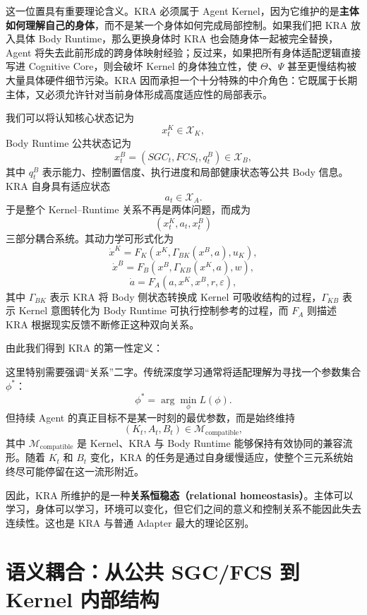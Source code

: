 这一位置具有重要理论含义。KRA 必须属于 Agent Kernel，因为它维护的是\textbf{主体如何理解自己的身体}，而不是某一个身体如何完成局部控制。如果我们把 KRA 放入具体 Body Runtime，那么更换身体时 KRA 也会随身体一起被完全替换，Agent 将失去此前形成的跨身体映射经验；反过来，如果把所有身体适配逻辑直接写进 Cognitive Core，则会破坏 Kernel 的身体独立性，使 $\Theta$、$\Psi$ 甚至更慢结构被大量具体硬件细节污染。KRA 因而承担一个十分特殊的中介角色：它既属于长期主体，又必须允许针对当前身体形成高度适应性的局部表示。

我们可以将认知核心状态记为
\[
x^K_t\in\mathcal X_K,
\]
Body Runtime 公共状态记为
\[
x^B_t
=
\left(
SGC_t,
FCS_t,
q^{B}_t
\right)
\in\mathcal X_B,
\]
其中 $q^B_t$ 表示能力、控制置信度、执行进度和局部健康状态等公共 Body 信息。KRA 自身具有适应状态
\[
a_t\in\mathcal X_A.
\]
于是整个 Kernel--Runtime 关系不再是两体问题，而成为
\[
\boxed{
(x^K_t,a_t,x^B_t)
}
\]
三部分耦合系统。其动力学可形式化为
\[
\dot x^K
=
F_K
\left(
x^K,
\Gamma_{BK}(x^B,a),
u_K
\right),
\]
\[
\dot x^B
=
F_B
\left(
x^B,
\Gamma_{KB}(x^K,a),
w
\right),
\]
\[
\dot a
=
F_A
\left(
a,
x^K,
x^B,
r,
\varepsilon
\right),
\]
其中 $\Gamma_{BK}$ 表示 KRA 将 Body 侧状态转换成 Kernel 可吸收结构的过程，$\Gamma_{KB}$ 表示 Kernel 意图转化为 Body Runtime 可执行控制参考的过程，而 $F_A$ 则描述 KRA 根据现实反馈不断修正这种双向关系。

由此我们得到 KRA 的第一性定义：
\begin{statementbox}
\centering
{}
\end{statementbox}

这里特别需要强调``关系''二字。传统深度学习通常将适配理解为寻找一个参数集合 $\phi^{*}$：
\[
\phi^{*}
=
\arg\min_{\phi}
L(\phi).
\]
但持续 Agent 的真正目标不是某一时刻的最优参数，而是始终维持
\[
\boxed{
(K_t,A_t,B_t)
\in
\mathcal M_{\mathrm{compatible}},
}
\]
其中 $\mathcal M_{\mathrm{compatible}}$ 是 Kernel、KRA 与 Body Runtime 能够保持有效协同的兼容流形。随着 $K_t$ 和 $B_t$ 变化，KRA 的任务是通过自身缓慢适应，使整个三元系统始终尽可能停留在这一流形附近。

因此，KRA 所维护的是一种\textbf{关系恒稳态（relational homeostasis）}。主体可以学习，身体可以学习，环境可以变化，但它们之间的意义和控制关系不能因此失去连续性。这也是 KRA 与普通 Adapter 最大的理论区别。

\section{语义耦合：从公共 SGC/FCS 到 Kernel 内部结构}
\label{sec:kra-semantic-coupling}

